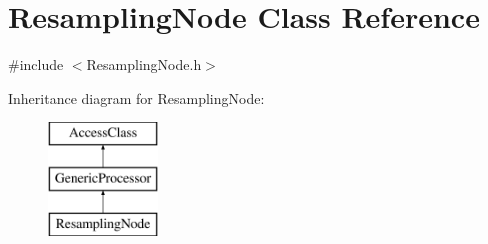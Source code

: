 \hypertarget{classResamplingNode}{\section{Resampling\-Node Class Reference}
\label{classResamplingNode}
}


{\ttfamily \#include $<$Resampling\-Node.\-h$>$}

Inheritance diagram for Resampling\-Node\-:\begin{figure}[H]
\begin{center}
\leavevmode
\includegraphics[height=3.000000cm]{classResamplingNode}
\end{center}
\end{figure}
